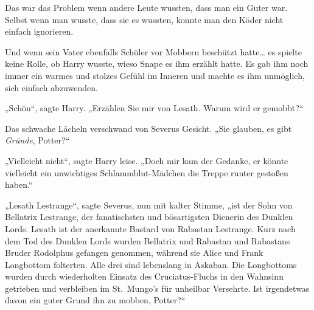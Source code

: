 Das war das Problem wenn andere Leute wussten, dass man ein Guter war. Selbst wenn man wusste, dass sie es wussten, konnte man den Köder nicht einfach ignorieren.

Und wenn sein Vater ebenfalls Schüler vor Mobbern beschützt hatte… es spielte keine Rolle, ob Harry wusste, wieso Snape es ihm erzählt hatte. Es gab ihm noch immer ein warmes und stolzes Gefühl im Inneren und machte es ihm unmöglich, sich einfach abzuwenden.

„Schön“, sagte Harry. „Erzählen Sie mir von Lesath. Warum wird er gemobbt?“

Das schwache Lächeln verschwand von Severus Gesicht. „Sie glauben, es gibt \emph{Gründe}, Potter?“

„Vielleicht nicht“, sagte Harry leise. „Doch mir kam der Gedanke, er könnte vielleicht ein unwichtiges Schlammblut-Mädchen die Treppe runter gestoßen haben.“

„Lesath Lestrange“, sagte Severus, nun mit kalter Stimme, „ist der Sohn von Bellatrix Lestrange, der fanatischsten und bösartigsten Dienerin des Dunklen Lords. Lesath ist der anerkannte Bastard von Rabastan Lestrange. Kurz nach dem Tod des Dunklen Lords wurden Bellatrix und Rabastan und Rabastans Bruder Rodolphus gefangen genommen, während sie Alice und Frank Longbottom folterten. Alle drei sind lebenslang in Askaban. Die Longbottoms wurden durch wiederholten Einsatz des Cruciatus-Fluchs in den Wahnsinn getrieben und verbleiben im St.~Mungo’s für unheilbar Versehrte. Ist irgendetwas davon ein guter Grund ihn zu mobben, Potter?“


